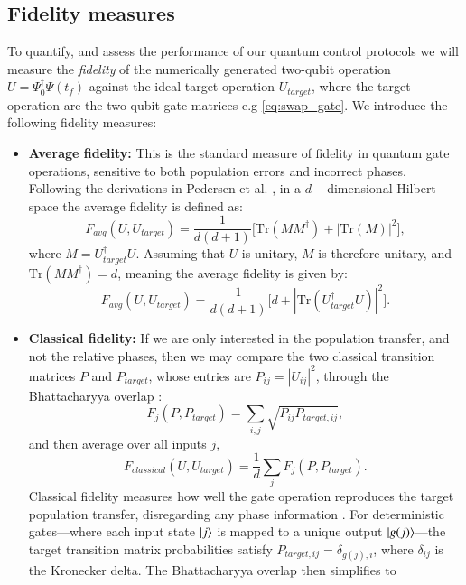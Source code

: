 \documentclass{subfiles}
\begin{document}
\subsection{Fidelity measures}\label{sec:fidelity_measures}
To quantify, and assess the performance of our quantum control protocols we will measure the \emph{fidelity} of the numerically generated two-qubit operation $U = \Psi_0^\dagger\Psi(t_f)$ against the ideal target operation $U_{target}$, where the target operation are the two-qubit gate matrices e.g \eqref{eq:swap_gate}. 
We introduce the following fidelity measures:
\begin{itemize}
    \item \textbf{Average fidelity:} This is the standard measure of fidelity in quantum gate operations, sensitive to both population errors and incorrect phases. Following the derivations in Pedersen et al. \cite{pedersen2007fidelity}, in a $d-$dimensional Hilbert space the average fidelity is defined as:
    \begin{equation*}
    F_{avg}(U, U_{target}) = \frac{1}{d(d+1)}\bigg[\text{Tr}(MM^\dagger) + |\text{Tr}(M)|^2\bigg],
    \end{equation*}
    where $M = U_{target}^\dagger U$. Assuming that $U$ is unitary, $M$ is therefore unitary, and $\text{Tr}(MM^\dagger) = d$, meaning the average fidelity is given by:
    \begin{equation}
        F_{avg}(U, U_{target}) = \frac{1}{d(d+1)}\bigg[d + |\text{Tr}(U_{target}^\dagger U)|^2\bigg]\label{eq:avg_fidelity}.
    \end{equation}
    \item \textbf{Classical fidelity:} If we are only interested in the population transfer, and not the relative phases, then we may compare the two classical transition matrices $P$ and $P_{target}$, whose entries are $P_{ij} = |U_{ij}|^2$, through the Bhattacharyya overlap \cite{bhattacharyya1943measure}:
    \begin{equation*}
        F_j(P, P_{target}) = \sum_{i,j} \sqrt{P_{ij} P_{target,ij}},
    \end{equation*}
    and then average over all inputs $j$,
    \begin{equation}
        F_{classical}(U, U_{target}) = \frac{1}{d}\sum_j F_j(P, P_{target})\label{eq:classical_fidelity}. 
    \end{equation} 
    Classical fidelity measures how well the gate operation reproduces the target population transfer, disregarding any phase information \cite{nielsen2010quantum}. For deterministic gates—where each input state $\ket{j}$ is mapped to a unique output $\ket{g(j)}$—the target transition matrix probabilities satisfy $P_{target,ij} = \delta_{g(j),i}$, where $\delta_{ij}$ is the Kronecker delta. The Bhattacharyya overlap then simplifies to

\end{itemize}
\end{document}
